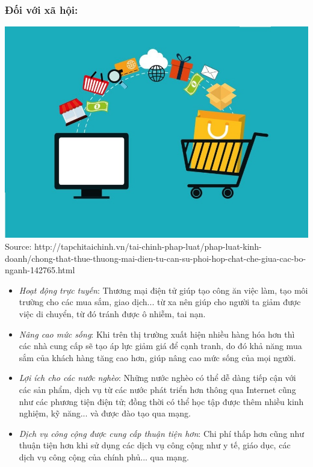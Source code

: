 \documentclass[13pt,a4paper]{article}
\begin{document}
\subsubsection{Đối với xã hội:}
\begin{center}
\includegraphics[scale=0.5]{images/bene2.jpg}\\
\fontsize{10pt}{1.2pt}\selectfont
    Source: http://tapchitaichinh.vn/tai-chinh-phap-luat/phap-luat-kinh-doanh/chong-that-thue-thuong-mai-dien-tu-can-su-phoi-hop-chat-che-giua-cac-bo-nganh-142765.html
\end{center}
\begin{itemize}
\item \textit{Hoạt động trực tuyến}: Thương mại điện tử giúp tạo công ăn việc làm, tạo môi trường cho các mua sắm, giao dịch... từ xa nên giúp cho người ta giảm được việc di chuyển, từ đó tránh được ô nhiễm, tai nạn.\\
\item \textit{Nâng cao mức sống}: Khi trên thị trường xuất hiện nhiều hàng hóa hơn thì các nhà cung cấp sẽ tạo áp lực giảm giá để cạnh tranh, do đó khả năng mua sắm của khách hàng  tăng cao hơn, giúp nâng cao mức sống của mọi người.\\
\item \textit{Lợi ích cho các nước nghèo}: Những nước nghèo có thể dễ dàng tiếp cận với các sản phẩm, dịch vụ từ các nước
phát triển hơn thông qua Internet cũng như các phương tiện điện tử; đồng thời có thể học tập được thêm nhiều kinh nghiệm, kỹ năng... và được đào tạo qua mạng.\\
\item \textit{Dịch vụ công cộng được cung cấp thuận tiện hơn}: Chi phí thấp hơn cũng như thuận tiện hơn khi sử dụng các dịch vụ công cộng như y tế, giáo dục, các dịch vụ công cộng của chính phủ... qua mạng.
\end{itemize}
\end{document}
